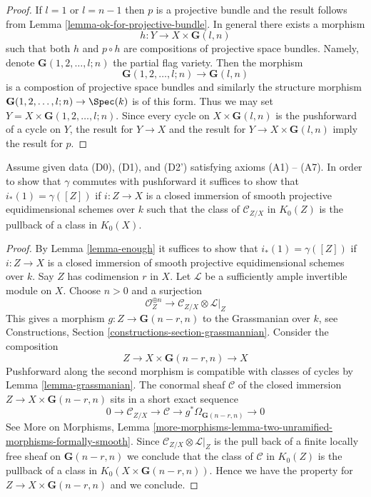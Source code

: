 \begin{proof}
If $l = 1$ or $l = n - 1$ then $p$ is a projective bundle and
the result follows from Lemma \ref{lemma-ok-for-projective-bundle}.
In general there exists a morphism
$$
h : Y \to X \times \mathbf{G}(l, n)
$$
such that both $h$ and $p \circ h$ are compositions of projective
space bundles. Namely, denote $\mathbf{G}(1, 2, \ldots, l; n)$
the partial flag variety. Then the morphism
$$
\mathbf{G}(1, 2, \ldots, l; n) \to \mathbf{G}(l, n)
$$
is a compostion of projective space bundles and similarly the
structure morphism $\mathbf{G}(1, 2, \ldots, l; n) \to \Spec(k)$
is of this form. Thus we may set $Y = X \times \mathbf{G}(1, 2, \ldots, l; n)$.
Since every cycle on $X \times \mathbf{G}(l, n)$ is the pushforward of
a cycle on $Y$, the result for $Y \to X$ and the result for
$Y \to X \times \mathbf{G}(l, n)$ imply the result for $p$.
\end{proof}

\begin{lemma}
\label{lemma-enough-better}
Assume given data (D0), (D1), and (D2') satisfying axioms (A1) -- (A7).
In order to show that $\gamma$ commutes with pushforward it suffices
to show that $i_*(1) = \gamma([Z])$ if $i : Z \to X$ is a closed
immersion of smooth projective equidimensional schemes over $k$
such that the class of $\mathcal{C}_{Z/X}$ in $K_0(Z)$ is the
pullback of a class in $K_0(X)$.
\end{lemma}

\begin{proof}
By Lemma \ref{lemma-enough} it suffices to show that $i_*(1) = \gamma([Z])$
if $i : Z \to X$ is a closed immersion of smooth projective equidimensional
schemes over $k$. Say $Z$ has codimension $r$ in $X$.
Let $\mathcal{L}$ be a sufficiently ample invertible module on $X$.
Choose $n > 0$ and a surjection
$$
\mathcal{O}_Z^{\oplus n} \to \mathcal{C}_{Z/X} \otimes \mathcal{L}|_Z
$$
This gives a morphism $g : Z \to \mathbf{G}(n - r, n)$
to the Grassmanian over $k$, see
Constructions, Section \ref{constructions-section-grassmannian}.
Consider the composition
$$
Z \to X \times \mathbf{G}(n - r, n) \to X
$$
Pushforward along the second morphism is compatible with classes
of cycles by Lemma \ref{lemma-grassmanian}. The conormal sheaf $\mathcal{C}$
of the closed immersion $Z \to X \times \mathbf{G}(n - r, n)$ sits in
a short exact sequence
$$
0 \to \mathcal{C}_{Z/X} \to \mathcal{C} \to
g^*\Omega_{\mathbf{G}(n - r, n)} \to 0
$$
See More on Morphisms, Lemma
\ref{more-morphisms-lemma-two-unramified-morphisms-formally-smooth}.
Since $\mathcal{C}_{Z/X} \otimes \mathcal{L}|_Z$ is the pull
back of a finite locally free sheaf on $\mathbf{G}(n - r, n)$
we conclude that the class of $\mathcal{C}$ in $K_0(Z)$
is the pullback of a class in $K_0(X \times \mathbf{G}(n - r, n))$.
Hence we have the property for $Z \to X \times \mathbf{G}(n - r, n)$
and we conclude.
\end{proof}

